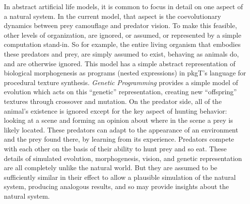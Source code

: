 \documentclass[acmtog]{acmart}
\newcommand{\jargon}[1]{\textit{#1}}
\newcommand{\texsyn}[0]{pkgT}
\begin{document}
In abstract artificial life models, it is common to focus in detail on one aspect of a natural system. In the current model, that aspect is the coevolutionary dynamics between prey camouflage and predator vision. To make this feasible, other levels of organization, are ignored, or assumed, or represented by a simple computation stand-in. So for example, the entire living organism that embodies these predators and prey, are simply assumed to exist, behaving as animals do, and are otherwise ignored. This model has a simple abstract representation of biological morphogenesis as programs (nested expressions) in \texsyn{}'s language for procedural texture synthesis. \jargon{Genetic Programming} provides a simple model of evolution which acts on this “genetic” representation, creating new “offspring” textures through crossover and mutation. On the predator side, all of the animal's existence is ignored except for the key aspect of hunting behavior: looking at a scene and forming an opinion about where in the scene a prey is likely located. These predators can adapt to the appearance of an environment and the prey found there, by learning from its experience. Predators compete with each other on the basis of their ability to hunt prey and so eat. These details of simulated evolution, morphogenesis, vision, and genetic representation are all completely unlike the natural world. But they are assumed to be sufficiently similar in their effect to allow a plausible simulation of the natural system, producing analogous results, and so may provide insights about the natural system.
\par

\end{document}
